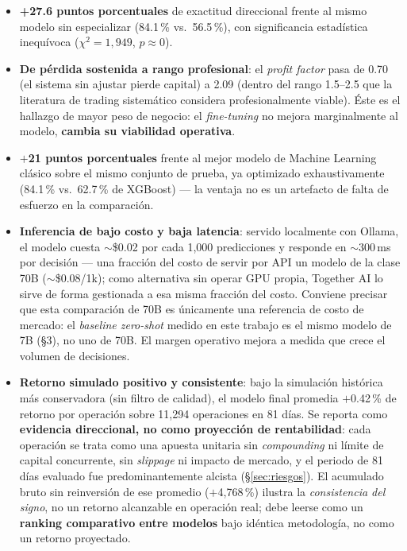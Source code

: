 \documentclass[11pt]{article}
\begin{document}
\begin{itemize}
\item \textbf{+27.6 puntos porcentuales} de exactitud direccional frente al mismo modelo sin especializar (84.1\,\% vs.\ 56.5\,\%), con significancia estad\'istica inequ\'ivoca ($\chi^2=1{,}949$, $p\approx0$).
\item \textbf{De p\'erdida sostenida a rango profesional}: el \textit{profit factor} pasa de 0.70 (el sistema sin ajustar pierde capital) a 2.09 (dentro del rango 1.5--2.5 que la literatura de trading sistem\'atico considera profesionalmente viable). \'Este es el hallazgo de mayor peso de negocio: el \textit{fine-tuning} no mejora marginalmente al modelo, \textbf{cambia su viabilidad operativa}.
\item \textbf{$+$21 puntos porcentuales} frente al mejor modelo de Machine Learning cl\'asico sobre el mismo conjunto de prueba, ya optimizado exhaustivamente (84.1\,\% vs.\ 62.7\,\% de XGBoost) --- la ventaja no es un artefacto de falta de esfuerzo en la comparaci\'on.
\item \textbf{Inferencia de bajo costo y baja latencia}: servido localmente con Ollama, el modelo cuesta $\sim$\$0.02 por cada 1{,}000 predicciones y responde en $\sim$300\,ms por decisi\'on --- una fracci\'on del costo de servir por API un modelo de la clase 70B ($\sim$\$0.08/1k); como alternativa sin operar GPU propia, Together AI lo sirve de forma gestionada a esa misma fracci\'on del costo. Conviene precisar que esta comparaci\'on de 70B es \'unicamente una referencia de costo de mercado: el \textit{baseline zero-shot} medido en este trabajo es el mismo modelo de 7B (\S3), no uno de 70B. El margen operativo mejora a medida que crece el volumen de decisiones.
\item \textbf{Retorno simulado positivo y consistente}: bajo la simulaci\'on hist\'orica m\'as conservadora (sin filtro de calidad), el modelo final promedia $+$0.42\,\% de retorno por operaci\'on sobre 11{,}294 operaciones en 81 d\'ias. Se reporta como \textbf{evidencia direccional, no como proyecci\'on de rentabilidad}: cada operaci\'on se trata como una apuesta unitaria sin \textit{compounding} ni l\'imite de capital concurrente, sin \textit{slippage} ni impacto de mercado, y el periodo de 81 d\'ias evaluado fue predominantemente alcista (\S\ref{sec:riesgos}). El acumulado bruto sin reinversi\'on de ese promedio ($+$4{,}768\,\%) ilustra la \emph{consistencia del signo}, no un retorno alcanzable en operaci\'on real; debe leerse como un \textbf{ranking comparativo entre modelos} bajo id\'entica metodolog\'ia, no como un retorno proyectado.
\end{itemize}
\end{document}
